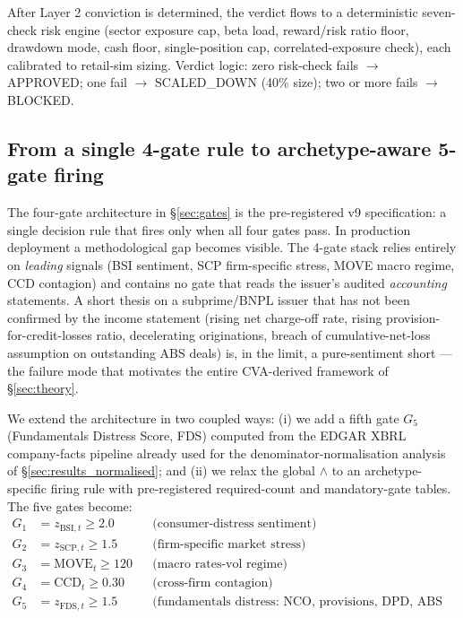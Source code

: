 \documentclass[11pt,a4paper]{article}
\begin{document}
After Layer 2 conviction is determined, the verdict flows to a deterministic seven-check risk engine (sector exposure cap, beta load, reward/risk ratio floor, drawdown mode, cash floor, single-position cap, correlated-exposure check), each calibrated to retail-sim sizing. Verdict logic: zero risk-check fails $\to$ APPROVED; one fail $\to$ SCALED\_DOWN (40\% size); two or more fails $\to$ BLOCKED.

\subsection{From a single 4-gate rule to archetype-aware 5-gate firing}\label{sec:archetype_gates}

The four-gate architecture in §\ref{sec:gates} is the pre-registered v9 specification: a single decision rule that fires only when all four gates pass. In production deployment a methodological gap becomes visible. The 4-gate stack relies entirely on \emph{leading} signals (BSI sentiment, SCP firm-specific stress, MOVE macro regime, CCD contagion) and contains no gate that reads the issuer's audited \emph{accounting} statements. A short thesis on a subprime/BNPL issuer that has not been confirmed by the income statement (rising net charge-off rate, rising provision-for-credit-losses ratio, decelerating originations, breach of cumulative-net-loss assumption on outstanding ABS deals) is, in the limit, a pure-sentiment short --- the failure mode that motivates the entire CVA-derived framework of §\ref{sec:theory}.

We extend the architecture in two coupled ways: (i) we add a fifth gate $G_5$ (Fundamentals Distress Score, FDS) computed from the EDGAR XBRL company-facts pipeline already used for the denominator-normalisation analysis of §\ref{sec:results_normalised}; and (ii) we relax the global $\wedge$ to an archetype-specific firing rule with pre-registered required-count and mandatory-gate tables. The five gates become:
\begin{align*}
G_1 &= z_{\text{BSI},t} \ge 2.0 && \text{(consumer-distress sentiment)} \\
G_2 &= z_{\text{SCP},t} \ge 1.5 && \text{(firm-specific market stress)} \\
G_3 &= \text{MOVE}_{t} \ge 120 && \text{(macro rates-vol regime)} \\
G_4 &= \text{CCD}_t \ge 0.30   && \text{(cross-firm contagion)} \\
G_5 &= z_{\text{FDS},t} \ge 1.5 && \text{(fundamentals distress: NCO, provisions, DPD, ABS CNL)}
\end{align*}
\end{document}
